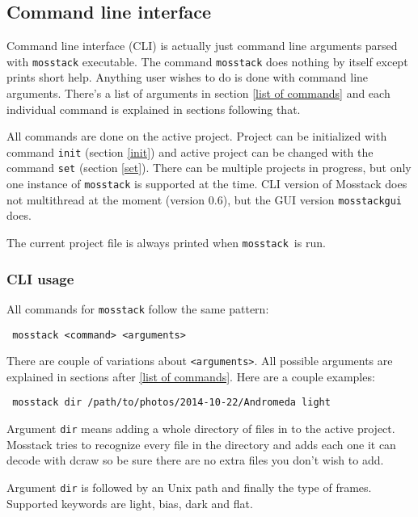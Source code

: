 \documentclass[twoside,a4paper]{refart}
\begin{document}
\subsection{Command line interface}
\label{cli}

Command line interface (CLI) is actually just command line arguments parsed with \texttt{mosstack} executable. The command
\texttt{mosstack} does nothing by itself except prints short help. Anything user wishes to do is done with command line
arguments. There's a list of arguments in section \ref{list of commands} and each individual command is explained in sections
following that.

All commands are done on the active project. Project can be initialized with command \texttt{init} (section \ref{init}) and
active project can be changed with the command \texttt{set} (section \ref{set}). There can be multiple projects in progress,
but only one instance of \texttt{mosstack} is supported at the time. CLI version of Mosstack does not multithread at the
moment (version 0.6), but the GUI version \texttt{mosstackgui} does.

The current project file is always printed when \texttt{mosstack} is run.

\subsubsection{CLI usage}
\label{cli usage}

All commands for \texttt{mosstack} follow the same pattern:

\begin{verbatim}
 mosstack <command> <arguments>
\end{verbatim}

There are couple of variations about \texttt{<arguments>}. All possible arguments are explained in sections after \ref{list of commands}.
Here are a couple examples:

\begin{verbatim}
 mosstack dir /path/to/photos/2014-10-22/Andromeda light
\end{verbatim}

Argument \texttt{dir} means adding a whole directory of files in to the active project. Mosstack tries to recognize every file
in the directory and adds each one it can decode with dcraw so be sure there are no extra files you don't wish to add.

Argument \texttt{dir} is followed by an Unix path and finally the type of frames. Supported keywords are light, bias, dark and
flat.
\end{document}

